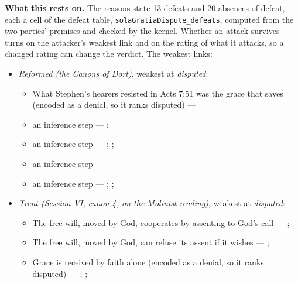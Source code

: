\documentclass[11pt]{article}
\begin{document}
\par\noindent\textbf{What this rests on.} The reasons state 13 defeats and 20 absences of defeat, each a cell of the defeat table, \texttt{sola\allowbreak{}Gratia\allowbreak{}Dispute\_\allowbreak{}defeats}, computed from the two parties' premises and checked by the kernel. Whether an attack survives turns on the attacker's weakest link and on the rating of what it attacks, so a changed rating can change the verdict. The weakest links:
\begin{itemize}
\item \emph{Reformed (the Canons of Dort)}, weakest at \emph{disputed}:
\begin{itemize}
\item What Stephen’s hearers resisted in Acts 7:51 was the grace that saves (encoded as a denial, so it ranks disputed) --- \cite[Canons of Dort, III/IV, art. 9]{schaff-creeds-christendom-3-1977}
\item an inference step --- \cite[ad loc. Eph 2:8]{robertson-word-pictures-4-1931}; \cite[228--229]{calvin-galatians-ephesians-1854}
\item an inference step --- \cite[600]{arminius-works-1-1825}; \cite[681]{arminius-works-1-1825}; \cite[Five Arminian Articles (1610), art. 4]{schaff-creeds-christendom-3-1977}
\item an inference step --- \cite[527--565]{arminius-works-3-1853}
\item an inference step --- \cite[Solid Declaration II.89]{concordia-triglotta-1921}; \cite[Solid Declaration II.60]{concordia-triglotta-1921}; \cite[Solid Declaration XI.41]{concordia-triglotta-1921}
\end{itemize}
\item \emph{Trent (Session VI, canon 4, on the Molinist reading)}, weakest at \emph{disputed}:
\begin{itemize}
\item The free will, moved by God, cooperates by assenting to God’s call --- \cite[Trent, Session VI (1547), canon 4]{tanner-decrees-1990}; \cite[45]{waterworth-trent-1848}
\item The free will, moved by God, can refuse its assent if it wishes --- \cite[Trent, Session VI (1547), canon 4]{tanner-decrees-1990}; \cite[45]{waterworth-trent-1848}
\item Grace is received by faith alone (encoded as a denial, so it ranks disputed) --- \cite[Augsburg Confession IV.1–3]{concordia-triglotta-1921}; \cite[Sermon 1, III.1]{wesley-sermons-1872}; \cite[Trent, Session VI (1547), canon 9]{tanner-decrees-1990}

\end{itemize}
\end{itemize}
\end{document}
